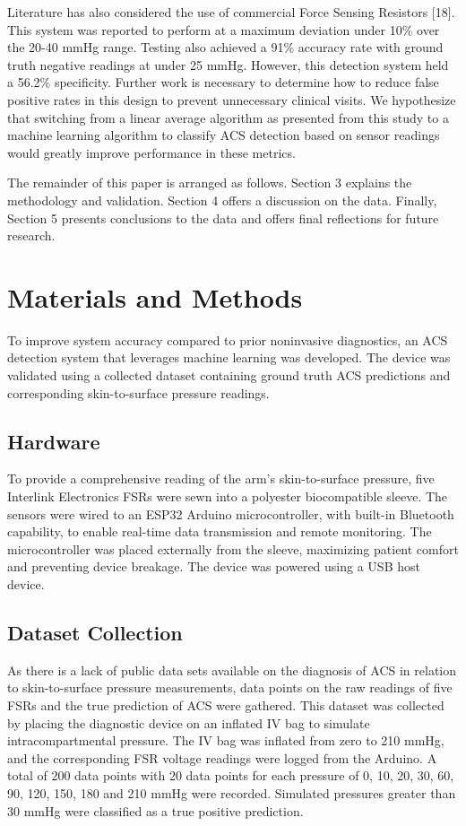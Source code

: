 \documentclass{article}
\begin{document}
Literature has also considered the use of commercial Force Sensing Resistors [18]. This system was reported to perform at a maximum deviation under 10\% over the 20-40 mmHg range. Testing also achieved a 91\% accuracy rate with ground truth negative readings at under 25 mmHg. However, this detection system held a 56.2\% specificity. Further work is necessary to determine how to reduce false positive rates in this design to prevent unnecessary clinical visits. We hypothesize that switching from a linear average algorithm as presented from this study to a machine learning algorithm to classify ACS detection based on sensor readings would greatly improve performance in these metrics.

The remainder of this paper is arranged as follows. Section 3 explains the methodology and validation.  Section 4 offers a discussion on the data. Finally, Section 5 presents conclusions to the data and offers final reflections for future research.

\section{Materials and Methods}
To improve system accuracy compared to prior noninvasive diagnostics, an ACS detection system that leverages machine learning was developed. The device was validated using a collected dataset containing ground truth ACS predictions and corresponding skin-to-surface pressure readings.

\subsection{Hardware}
To provide a comprehensive reading of the arm’s skin-to-surface pressure, five Interlink Electronics FSRs were sewn into a polyester biocompatible sleeve. The sensors were wired to an ESP32 Arduino microcontroller, with built-in Bluetooth capability, to enable real-time data transmission and remote monitoring. The microcontroller was placed externally from the sleeve, maximizing patient comfort and preventing device breakage. The device was powered using a USB host device.

\subsection{ Dataset Collection}
As there is a lack of public data sets available on the diagnosis of ACS in relation to skin-to-surface pressure measurements, data points on the raw readings of five FSRs and the true prediction of ACS were gathered. This dataset was collected by placing the diagnostic device on an inflated IV bag to simulate intracompartmental pressure. The IV bag was inflated from zero to 210 mmHg, and the corresponding FSR voltage readings were logged from the Arduino. A total of 200 data points with 20 data points for each pressure of 0, 10, 20, 30, 60, 90, 120, 150, 180 and 210 mmHg were recorded. Simulated pressures greater than 30 mmHg were classified as a true positive prediction. 
\end{document}
